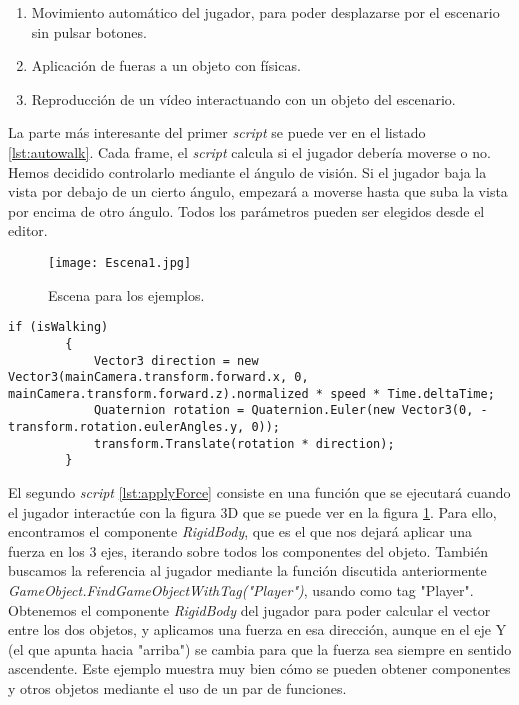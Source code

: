 \documentclass{pre-tfg}
\begin{document}
\begin{enumerate}
\item Movimiento automático del jugador, para poder desplazarse por el escenario sin pulsar botones.
\item Aplicación de fueras a un objeto con físicas.
\item Reproducción de un vídeo interactuando con un objeto del escenario.
\end{enumerate}

La parte más interesante del primer \textit{script} se puede ver en el listado \ref{lst:autowalk}. Cada frame, el \textit{script} calcula si el jugador debería moverse o no. Hemos decidido controlarlo mediante el ángulo de visión. Si el jugador baja la vista por debajo de un cierto ángulo, empezará a moverse hasta que suba la vista por encima de otro ángulo. Todos los parámetros pueden ser elegidos desde el editor.

\begin{figure}[htb]
	\centering
	\texttt{[image: Escena1.jpg]}
	\caption{Escena para los ejemplos.}
	\label{fig:Escena1}
\end{figure}

\begin{spacing}{1}
\begin{lstlisting}[float=htbp, caption=Translación y rotación del jugador en el movimiento automático, label=lst:autowalk]
if (isWalking)
        {
            Vector3 direction = new Vector3(mainCamera.transform.forward.x, 0, mainCamera.transform.forward.z).normalized * speed * Time.deltaTime;
            Quaternion rotation = Quaternion.Euler(new Vector3(0, -transform.rotation.eulerAngles.y, 0));
            transform.Translate(rotation * direction);
        }
\end{lstlisting}
\end{spacing}


El segundo \textit{script} \ref{lst:applyForce} consiste en una función que se ejecutará cuando el jugador interactúe con la figura 3D que se puede ver en la figura \ref{fig:Escena1}. Para ello, encontramos el componente \textit{RigidBody}, que es el que nos dejará aplicar una fuerza en los 3 ejes, iterando sobre todos los componentes del objeto. También buscamos la referencia al jugador mediante la función discutida anteriormente \textit{GameObject.FindGameObjectWithTag("Player")}, usando como tag "Player". Obtenemos el componente \textit{RigidBody} del jugador para poder calcular el vector entre los dos objetos, y aplicamos una fuerza en esa dirección, aunque en el eje Y (el que apunta hacia "arriba") se cambia para que la fuerza sea siempre en sentido ascendente. Este ejemplo muestra muy bien cómo se pueden obtener componentes y otros objetos mediante el uso de un par de funciones.
\end{document}
